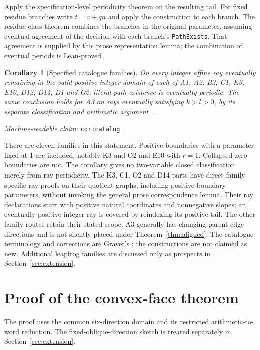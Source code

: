 \documentclass[11pt]{amsart}
\newcommand{\record}[1]{\nolinkurl{#1}}
\newcommand{\claimid}[1]{\par\nopagebreak\noindent\textit{Machine-readable claim:} \record{#1}.\par}
\newtheorem{catalogcor}{Corollary}
\theoremstyle{definition}\newtheorem{definition}{Definition}
\begin{document}
Apply the specification-level periodicity theorem on the resulting tail. For fixed
residue branches write $t=r+qn$ and apply the construction to each
branch. The residue-class theorem combines the branches in the
original parameter, assuming eventual
agreement of the decision with each branch's \record{PathExists}.
That agreement is supplied by this prose representation lemma;
the combination of eventual periods is Lean-proved.
\begin{catalogcor}[Specified catalogue families]\label{cor:catalog}
On every integer affine ray eventually remaining in the valid positive
integer domain of each of A1, A2, B2, C1, K3, E10, D12, D14, D1 and O2,
literal-path existence is eventually periodic. The same conclusion
holds for A3 on rays eventually satisfying $k>l>0$, by its separate
classification and arithmetic argument~\cite{A3}.
\end{catalogcor}
\claimid{cor:catalog}
There are eleven families in this statement. Positive boundaries with
a parameter fixed at 1 are included, notably K3 and O2 and E10 with
$r=1$. Collapsed zero boundaries are not. The corollary gives no
two-variable closed classification merely from ray periodicity.
The K3, C1, O2 and D14 parts have direct family-specific ray proofs on their
quotient graphs, including positive boundary parameters, without invoking the
general prose correspondence lemma. Their ray declarations start with
positive natural coordinates and nonnegative slopes; an eventually positive
integer ray is covered by reindexing its positive tail. The other family
routes retain their stated scope.
A3 generally has changing parent-edge directions and is not silently
placed under Theorem~\ref{thm:aligned}. The catalogue terminology and
corrections are Graver's \cite{Graver}; the constructions are not claimed
as new. Additional leapfrog families are discussed only as prospects
in Section~\ref{sec:extension}.

\section{Proof of the convex-face theorem}\label{sec:proof}
The proof uses the common six-direction domain and its restricted
arithmetic-to-word reduction. The fixed-oblique-direction sketch is
treated separately in Section~\ref{sec:extension}.
\end{document}
